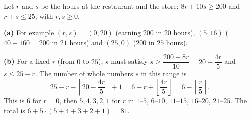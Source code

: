 Let $r$ and $s$ be the hours at the restaurant and the store: $8r+10s\ge200$ and $r+s\le25$, with $r,s\ge0$.

\textbf{(a)} For example $(r,s)=(0,20)$ (earning $200$ in $20$ hours), $(5,16)$ ($40+160=200$ in $21$ hours) and $(25,0)$ ($200$ in $25$ hours).

\textbf{(b)} For a fixed $r$ (from $0$ to $25$), $s$ must satisfy $s\ge\dfrac{200-8r}{10}=20-\dfrac{4r}5$ and $s\le25-r$. The number of whole numbers $s$ in this range is
\[25-r-\left\lceil20-\dfrac{4r}{5}\right\rceil+1=6-r+\left\lfloor\dfrac{4r}5\right\rfloor=6-\left\lceil\dfrac r5\right\rceil.\]
This is $6$ for $r=0$, then $5,4,3,2,1$ for $r$ in $1$--$5$, $6$--$10$, $11$--$15$, $16$--$20$, $21$--$25$. The total is $6+5\cdot(5+4+3+2+1)=\boxed{81}$.

